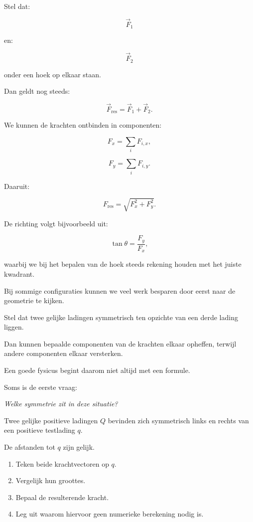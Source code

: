\documentclass{ximera}
\begin{document}
Stel dat:

\[
\vec F_1
\]

en:

\[
\vec F_2
\]

onder een hoek op elkaar staan.

Dan geldt nog steeds:

\[
\vec F_\mathrm{res}
=
\vec F_1+\vec F_2.
\]

We kunnen de krachten ontbinden in componenten:

\[
F_x=\sum_i F_{i,x},
\]

\[
F_y=\sum_i F_{i,y}.
\]

Daaruit:

\[
\boxed{
F_\mathrm{res}
=
\sqrt{F_x^2+F_y^2}.
}
\]

De richting volgt bijvoorbeeld uit:

\[
\boxed{
\tan\theta=\frac{F_y}{F_x},
}
\]

waarbij we bij het bepalen van de hoek steeds rekening houden met het
juiste kwadrant.




Bij sommige configuraties kunnen we veel werk besparen door eerst naar
de geometrie te kijken.

Stel dat twee gelijke ladingen symmetrisch ten opzichte van een derde
lading liggen.

Dan kunnen bepaalde componenten van de krachten elkaar opheffen,
terwijl andere componenten elkaar versterken.

Een goede fysicus begint daarom niet altijd met een formule.

Soms is de eerste vraag:

\begin{center}
\textit{Welke symmetrie zit in deze situatie?}
\end{center}


\begin{oefening}{\oefU\ESS}

Twee gelijke positieve ladingen $Q$ bevinden zich symmetrisch links en
rechts van een positieve testlading $q$.

De afstanden tot $q$ zijn gelijk.

\begin{enumerate}
  \item Teken beide krachtvectoren op $q$.
  \item Vergelijk hun groottes.
  \item Bepaal de resulterende kracht.
  \item Leg uit waarom hiervoor geen numerieke berekening nodig is.
\end{enumerate}

\end{oefening}
\end{document}
